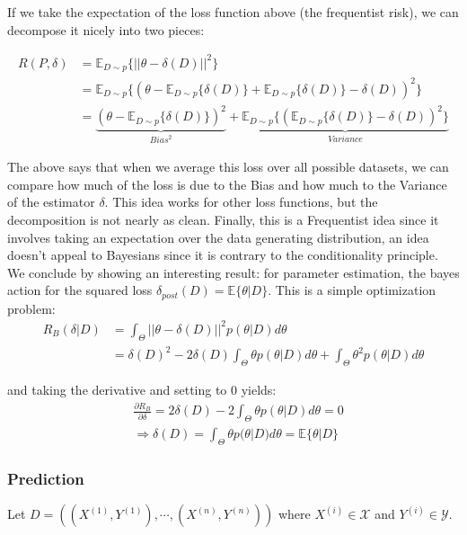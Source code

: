 \documentclass[]{article}
\theoremstyle{mattstyle}
\theoremstyle{definition}
\begin{document}
If we take the expectation of the loss function above (the frequentist risk), we can decompose it nicely into two pieces:

\begin{align*}
R(P,\delta)&=\mathbb{E}_{D\sim p}\{||\theta-\delta(D)||^2\}\\
&=\mathbb{E}_{D\sim p}\{(\theta-\mathbb{E}_{D\sim p}\{\delta(D)\} + \mathbb{E}_{D\sim p}\{\delta(D)\} - \delta(D))^2\}\\
&=\underbrace{(\theta-\mathbb{E}_{D\sim p}\{\delta(D)\})^2}_{Bias^2} + \underbrace{\mathbb{E}_{D\sim p}\{(\mathbb{E}_{D\sim p}\{\delta(D)\} - \delta(D))^2\}}_{Variance}
\end{align*}

The above says that when we average this loss over all possible datasets, we can compare how much of the loss is due to the Bias and how much to the Variance of the estimator $\delta$. This idea works for other loss functions, but the decomposition is not nearly as clean. Finally, this is a Frequentist idea since it involves taking an expectation over the data generating distribution, an idea doesn't appeal to Bayesians since it is contrary to the conditionality principle. 
\\

We conclude by showing an interesting result: for parameter estimation, the bayes action for the squared loss
\(\delta_{post}(D) = \mathbb{E}\{\theta|D\}\). This is a simple optimization problem:
\begin{align*}
R_B(\delta|D) &= \int_{\Theta}^{}||\theta-\delta(D)||^2p(\theta|D)d\theta \\
&=\delta(D)^2 -2\delta(D)\int_{\Theta}^{}\theta p(\theta|D)d\theta+\int_{\Theta}^{}\theta^2 p(\theta|D)d\theta
\end{align*}

and taking the derivative and setting to 0 yields:
\begin{align*}
&\frac{\partial R_B}{\partial \delta} = 2\delta(D) -2\int_{\Theta}^{}\theta p(\theta|D)d\theta = 0 \\
&\Rightarrow \delta(D) = \int_{\Theta}^{}\theta p(\theta|D)d\theta = \mathbb{E}\{\theta|D\}
\end{align*}

\newpage

\subsubsection{Prediction}
Let $D=((X^{(1)},Y^{(1)}), \cdots, (X^{(n)},Y^{(n)}))$ where $X^{(i)} \in \mathcal{X}$ and $Y^{(i)} \in \mathcal{Y}$. 
\end{document}
